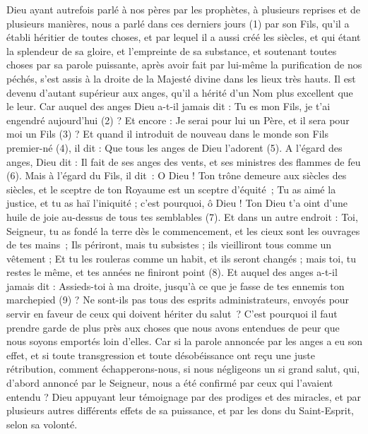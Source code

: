 \BFont
\begin{multicols}{2}
\VerseOne{}Dieu ayant autrefois parlé à nos pères par les prophètes, à plusieurs reprises et de plusieurs manières,
nous a parlé dans ces derniers jours (1) par son Fils, qu'il a établi héritier de toutes choses, et par lequel il a aussi créé les siècles,
et qui étant la splendeur de sa gloire, et l'empreinte de sa substance, et soutenant toutes choses par sa parole puissante, après avoir fait par lui-même la purification de nos péchés, s'est assis à la droite de la Majesté divine dans les lieux très hauts.
Il est devenu d'autant supérieur aux anges, qu'il a hérité d’un Nom plus excellent que le leur.
Car auquel des anges Dieu a-t-il jamais dit : Tu es mon Fils, je t'ai engendré aujourd'hui (2) ? Et encore : Je serai pour lui un Père, et il sera pour moi un Fils (3) ?
Et quand il introduit de nouveau dans le monde son Fils premier-né (4), il dit : Que tous les anges de Dieu l'adorent (5).
A l’égard des anges, Dieu dit : Il fait de ses anges des vents, et ses ministres des flammes de feu (6).
Mais à l’égard du Fils, il dit : O Dieu ! Ton trône demeure aux siècles des siècles, et le sceptre de ton Royaume est un sceptre d'équité ;
Tu as aimé la justice, et tu as haï l'iniquité ; c'est pourquoi, ô Dieu ! Ton Dieu t'a oint d'une huile de joie au-dessus de tous tes semblables (7).
Et dans un autre endroit : Toi, Seigneur, tu as fondé la terre dès le commencement, et les cieux sont les ouvrages de tes mains ;
Ils périront, mais tu subsistes ; ils vieilliront tous comme un vêtement ;
Et tu les rouleras comme un habit, et ils seront changés ; mais toi, tu restes le même, et tes années ne finiront point (8).
Et auquel des anges a-t-il jamais dit : Assieds-toi à ma droite, jusqu'à ce que je fasse de tes ennemis ton marchepied (9) ?
Ne sont-ils pas tous des esprits administrateurs, envoyés pour servir en faveur de ceux qui doivent hériter du salut ?
\VerseOne{}C'est pourquoi il faut prendre garde de plus près aux choses que nous avons entendues de peur que nous soyons emportés loin d’elles.
Car si la parole annoncée par les anges a eu son effet, et si toute transgression et toute désobéissance ont reçu une juste rétribution,
comment échapperons-nous, si nous négligeons un si grand salut, qui, d’abord annoncé par le Seigneur, nous a été confirmé par ceux qui l'avaient entendu ?
Dieu appuyant leur témoignage par des prodiges et des miracles, et par plusieurs autres différents effets de sa puissance, et par les dons du Saint-Esprit, selon sa volonté.

\end{multicols}
